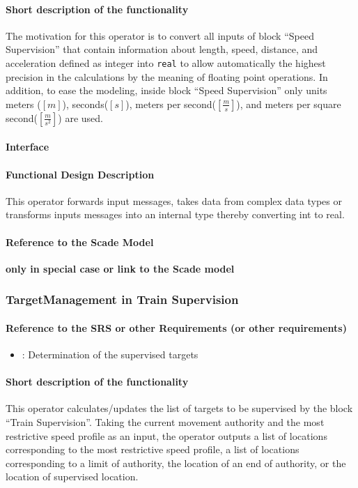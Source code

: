 \paragraph{Short description of the functionality}
The motivation for this operator is to convert all inputs of block ``Speed Supervision'' that contain information about length, speed, distance, and acceleration defined as integer into \texttt{real} to allow automatically the highest precision in the calculations by the meaning of floating point operations. In addition, to ease the modeling, inside block ``Speed Supervision'' only units meters ($[m]$), seconds($[s]$), meters per second($[\frac{m}{s}]$), and meters per square second($[\frac{m}{s^{2}}]$) are used.

\paragraph{Interface}

\paragraph{Functional Design Description}
This operator forwards input messages, takes data from complex data types or transforms inputs messages into an internal type thereby converting int to real.
  
\paragraph{Reference to the Scade Model}
\textbf{only in special case or link to the Scade model}

\subsubsection{TargetManagement in Train Supervision} 
\paragraph{Reference to the SRS or other Requirements (or other requirements)}
\begin{itemize}
	\item \cite[Chapt.~3.13.8.2]{subset-026}: Determination of the supervised targets 
\end{itemize}

\paragraph{Short description of the functionality}
This operator calculates/updates the list of targets to be supervised by the block ``Train Supervision''. Taking the current movement authority and the most restrictive speed profile as an input, the operator outputs a list of locations corresponding to the most restrictive speed profile, a list of locations corresponding to a limit of authority, the location of an end of authority, or the location of supervised location.

